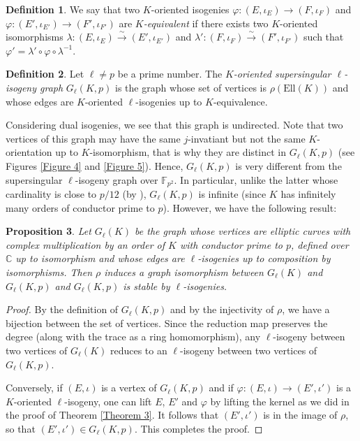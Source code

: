 \documentclass[a4paper,10pt,notitlepage]{report}
\theoremstyle{definition}
\newtheorem{Definition}{Definition}[chapter]
\theoremstyle{plain}
\newtheorem{Proposition}[Definition]{Proposition}
\theoremstyle{definition}
\newcommand{\C}{\mathbb{C}}
\newcommand{\F}{\mathbb{F}}
\renewcommand{\(}{\left(}
\renewcommand{\)}{\right)}
\begin{document}
\begin{Definition}
We say that two $K$-oriented isogenies $\varphi: (E,\iota_E)\longrightarrow (F,\iota_F)$ and $\varphi: (E',\iota_{E'})\longrightarrow (F',\iota_{F'})$ are \emph{$K$-equivalent} if there exists two $K$-oriented isomorphisms $\lambda:(E,\iota_E)\overset{\sim}{\longrightarrow} (E',\iota_{E'})$ and $\lambda':(F,\iota_F)\overset{\sim}{\longrightarrow} (F',\iota_{F'})$ such that $\varphi'=\lambda'\circ\varphi\circ\lambda^{-1}$.
\end{Definition}

\begin{Definition}
Let $\ell\neq p$ be a prime number. The \emph{$K$-oriented supersingular $\ell$-isogeny graph} $G_\ell(K,p)$ is the graph whose set of vertices is $\rho(\mbox{Ell}(K))$ and whose edges are $K$-oriented $\ell$-isogenies up to $K$-equivalence.
\end{Definition}

Considering dual isogenies, we see that this graph is undirected. Note that two vertices of this graph may have the same $j$-invatiant but not the same $K$-orientation up to $K$-isomorphism, that is why they are distinct in $G_\ell(K,p)$ (see Figures \ref{Figure 4} and \ref{Figure 5}). Hence, $G_\ell(K,p)$ is very different from the supersingular $\ell$-isogeny graph over $\F_{p^2}$. In particular, unlike the latter whose cardinality is close to $p/12$ (by \cite[Theorem V.4.1.(c)]{Silverman1}), $G_\ell(K,p)$ is infinite (since $K$ has infinitely many orders of conductor prime to $p$). However, we have the following result:

\begin{Proposition}\label{Proposition 15}
Let $G_\ell(K)$ be the graph whose vertices are elliptic curves with complex multiplication by an order of $K$ with conductor prime to $p$, defined over $\C$ up to isomorphism and whose edges are $\ell$-isogenies up to composition by isomorphisms. Then $\rho$ induces a graph isomorphism between $G_\ell(K)$ and $G_\ell(K,p)$ and $G_\ell(K,p)$ is stable by $\ell$-isogenies.
\end{Proposition}

\begin{proof}
By the definition of $G_\ell(K,p)$ and by the injectivity of $\rho$, we have a bijection between the set of vertices. Since the reduction map preserves the degree (along with the trace as a ring homomorphism), any $\ell$-isogeny between two vertices of $G_\ell(K)$ reduces to an $\ell$-isogeny between two vertices of $G_\ell(K,p)$.  

Conversely, if $(E,\iota)$ is a vertex of $G_\ell(K,p)$ and if $\varphi:(E,\iota)\longrightarrow (E',\iota')$ is a $K$-oriented $\ell$-isogeny, one can lift $E$, $E'$ and $\varphi$ by lifting the kernel as we did in the proof of Theorem \ref{Theorem 3}. It follows that $(E',\iota')$ is in the image of $\rho$, so that $(E',\iota')\in G_\ell(K,p)$. This completes the proof.
\end{proof}
\end{document}
